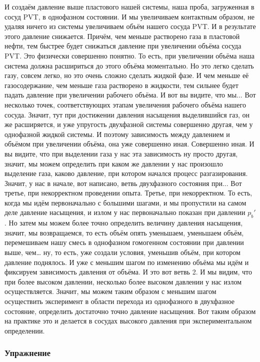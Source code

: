 \documentclass[main.tex]{subfiles}
\begin{document}
И создаём давление выше пластового нашей системы, наша проба, загруженная в сосуд PVT, в однофазном состоянии.
И мы увеличиваем контактным образом, не удаляя ничего из системы увеличиваем объём нашего сосуда PVT.
И в результате этого давление снижается.
Причём, чем меньше растворено газа в пластовой нефти, тем быстрее будет снижаться давление при увеличении объёма сосуда PVT.
Это физически совершенно понятно.
То есть, при увеличении объёма наша система должна расшириться до этого объёма моментально.
Но это легко сделать газу, совсем легко, но это очень сложно сделать жидкой фазе.
И чем меньше её газосодержание, чем меньше газа растворено в жидкости, тем сильнее будет падать давление при увеличении рабочего объёма.
И вот вы видите, что мы...
Вот несколько точек, соответствующих этапам увеличения рабочего объёма нашего сосуда.
Значит, тут при достижении давления насыщения выделившийся газ, он же расширяется, и уже упругость двухфазной системы совершенно другая, чем у однофазной жидкой системы.
И поэтому зависимость между давлением и объёмом при увеличении объёма, она уже совершенно иная.
Совершенно иная.
И вы видите, что при выделении газа у нас эта зависимость ну просто другая, значит, мы можем определить при каком же давлении у нас произошло выделение газа, каково давление, при котором начался процесс разгазирования.
Значит, у нас в начале, вот написано, ветвь двухфазного состояния при...
Вот третье, при некорректном проведении опыта.
Третье, при некорректном.
То есть, когда мы идём первоначально с большими шагами, и мы пропустили на самом деле давление насыщения, и излом у нас первоначально показан при давлении $p_b'$.
Но затем мы можем более точно определить величину давления насыщения, значит, мы возвращаемся, то есть объём опять уменьшаем, уменьшаем объём, перемешиваем нашу смесь в однофазном гомогенном состоянии при давлении выше, чем… ну, то есть, уже создали условия, уменьшив объём, при котором давление поднялось.
И уже с меньшим шагом по изменению объёма мы идём и фиксируем зависимость давления от объёма.
И это вот ветвь 2.
И мы видим, что при более высоком давлении, несколько более высоком давлении у нас излом осуществляется.
Значит, мы можем таким образом с меньшим шагом осуществить эксперимент в области перехода из однофазного в двухфазное состояние, определить достаточно точно давление насыщения.
Вот таким образом на практике это и делается в сосудах высокого давления при экспериментальном определении.

\subsubsection{Упражнение}
\end{document}
